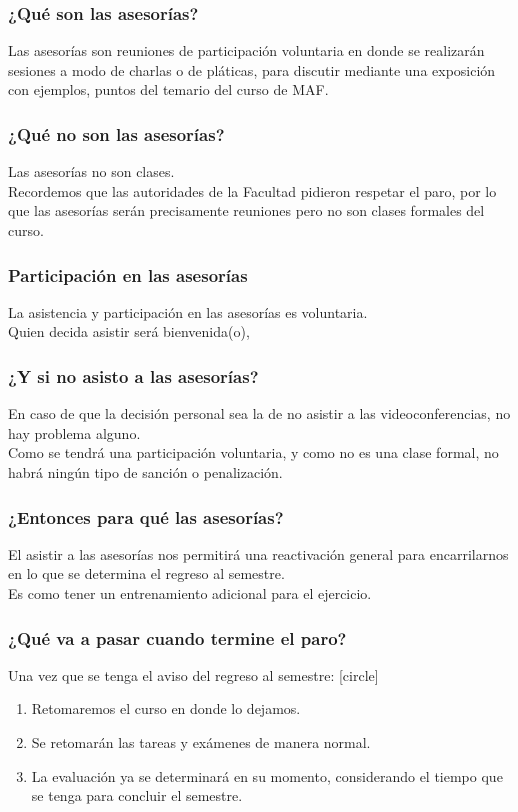 \begin{frame}
\frametitle{¿Qué son las asesorías?}
Las asesorías son reuniones de participación voluntaria en donde se realizarán sesiones a modo de charlas o de pláticas, para discutir mediante una exposición con ejemplos, puntos del temario del curso de MAF.
\end{frame}
\begin{frame}
\frametitle{¿Qué no son las asesorías?}
Las asesorías no son clases.
\\
\bigskip
\pause
Recordemos que las autoridades de la Facultad pidieron respetar el paro, por lo que las asesorías serán precisamente reuniones pero no son clases formales del curso.
\end{frame}
\begin{frame}
\frametitle{Participación en las asesorías}
La asistencia y participación en las asesorías es voluntaria.
\\
\bigskip
\pause
Quien decida asistir será bienvenida(o), 
\end{frame}
\begin{frame}
\frametitle{¿Y si no asisto a las asesorías?}
En caso de que la decisión personal sea la de no asistir a las videoconferencias, no hay problema alguno.
\\
\bigskip
\pause
Como se tendrá una participación voluntaria, y como no es una clase formal, no habrá ningún tipo de sanción o penalización.
\end{frame}
\begin{frame}
\frametitle{¿Entonces para qué las asesorías?}
El asistir a las asesorías nos permitirá una reactivación general para encarrilarnos en lo que se determina el regreso al semestre.
\\
\bigskip
\pause
Es como tener un entrenamiento adicional para el ejercicio.
\end{frame}
\begin{frame}
\frametitle{¿Qué va a pasar cuando termine el paro?}
Una vez que se tenga el aviso del regreso al semestre:
[circle]
\begin{enumerate}[<+->]
\item Retomaremos el curso en donde lo dejamos.
\item Se retomarán las tareas y exámenes de manera normal.
\item La evaluación ya se determinará en su momento, considerando el tiempo que se tenga para concluir el semestre.
\end{enumerate}
\end{frame}
